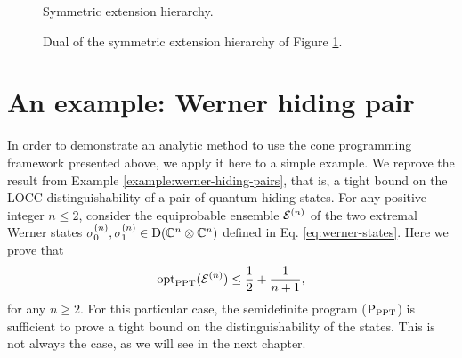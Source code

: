 
\begin{figure}[!htbp]
  \centering
    \def\svgwidth{200pt}
    \scalebox{.85}{
    }
    \caption{Symmetric extension hierarchy.}
    \label{fig:symm-extension}
\end{figure}

\begin{figure}[!htbp]
  \centering
    \def\svgwidth{200pt}
    \scalebox{.85}{
    }
    \caption{Dual of the symmetric extension hierarchy of Figure \ref{fig:symm-extension}.}
    \label{fig:symm-extension-dual}
\end{figure}

\section{An example: Werner hiding pair}

In order to demonstrate an analytic method to use the cone programming framework
presented above, we apply it here to a simple example. 
We reprove the result from Example \ref{example:werner-hiding-pairs},
that is, a tight bound on the LOCC-distinguishability of a pair of quantum hiding states.
For any positive integer $n \leq 2$, consider the equiprobable ensemble $\mathcal{E}^{(n)}$ of 
the two extremal Werner states
$\sigma_{0}^{(n)}, \sigma_{1}^{(n)} \in \mathrm{D}(\mathbb{C}^{n}\otimes\mathbb{C}^{n})$
defined in Eq. \eqref{eq:werner-states}.
Here we prove that
\begin{equation}
  \operatorname{opt}_{\mathrm{PPT}}(\mathcal{E}^{(n)}) \leq \frac{1}{2} + \frac{1}{n+1},
\end{equation}
for any $n \geq 2$.
For this particular case, the semidefinite program ($\textup{P}_{\mathrm{PPT}}$) is 
sufficient to prove a tight bound on the distinguishability of the states.
This is not always the case, as we will see in the next chapter.


